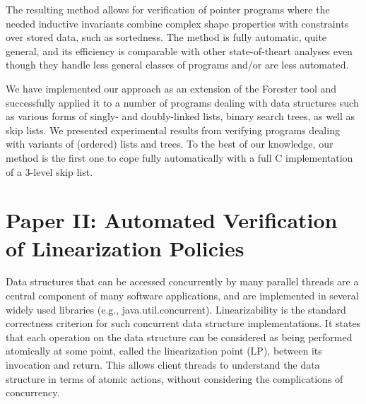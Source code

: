 The resulting method allows for verification of pointer programs where the needed inductive invariants combine complex shape properties with constraints over stored data, such as sortedness. The method is fully automatic, quite general, and its efficiency is comparable with other state-of-theart analyses even though they handle less general classes of programs and/or are less automated. 







We have implemented our approach as an extension of the Forester tool and successfully applied it to a number of programs dealing with data structures such as various forms of singly- and doubly-linked lists, binary search trees, as well as skip lists. We presented experimental results from verifying programs dealing with variants of (ordered) lists and trees. To the best of our knowledge, our method is the first one to cope fully automatically with a full C implementation of a 3-level skip list. 

\section{Paper II: Automated Verification of Linearization Policies} 
Data structures that can be accessed concurrently by many parallel threads are a central component of many software applications, and are implemented in several widely used libraries (e.g., java.util.concurrent). Linearizability is the standard correctness criterion for such concurrent data structure implementations. It states that each operation on the data structure can be considered as being performed atomically at some point, called the linearization point (LP), between its invocation and return. This allows client threads to understand the data structure in terms of atomic actions, without considering the complications of concurrency.

